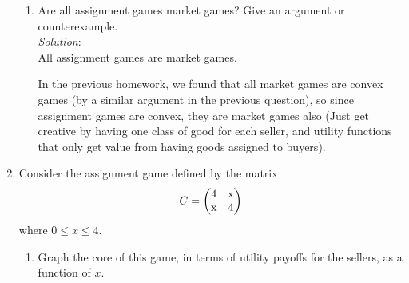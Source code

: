 \documentclass{article}
\begin{document}
\begin{enumerate}
\begin{enumerate}
    \item Are all assignment games market games? Give an argument or counterexample. \\

    \textit{Solution}: \\

    All assignment games are market games.

    In the previous homework, we found that all market games are convex games (by a similar argument in the previous question), so since assignment games are convex, they are market games also (Just get creative by having one class of good for each seller, and utility functions that only get value from having goods assigned to buyers).


    \end{enumerate}

\item Consider the assignment game defined by the matrix
\[
C = \begin{pmatrix}
  $4$ & $x$ \\
  $x$ & $4$
\end{pmatrix}
\]
where $0 \le x \le 4$.

    \begin{enumerate}
    \item Graph the core of this game, in terms of utility payoffs for the sellers, as a function of $x$. \\


\end{enumerate}
\end{enumerate}
\end{document}
